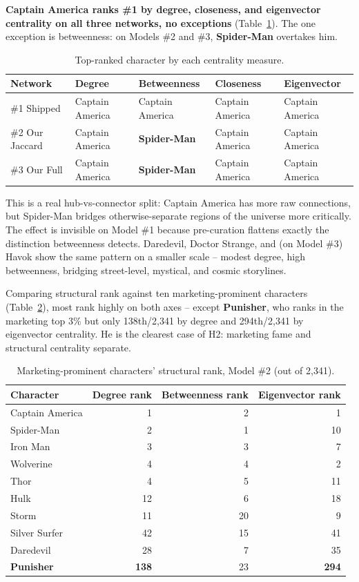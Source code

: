 \documentclass[11pt]{article}
\begin{document}
\textbf{Captain America ranks \#1 by degree, closeness, and eigenvector centrality on all three networks, no exceptions} (Table~\ref{tab:centrality}). The one exception is betweenness: on Models \#2 and \#3, \textbf{Spider-Man} overtakes him.

\begin{table}[H]
\centering
\caption{Top-ranked character by each centrality measure.}
\label{tab:centrality}
\begin{tabular}{lllll}
\toprule
Network & Degree & Betweenness & Closeness & Eigenvector \\
\midrule
\#1 Shipped & Captain America & Captain America & Captain America & Captain America \\
\#2 Our Jaccard & Captain America & \textbf{Spider-Man} & Captain America & Captain America \\
\#3 Our Full & Captain America & \textbf{Spider-Man} & Captain America & Captain America \\
\bottomrule
\end{tabular}
\end{table}

This is a real hub-vs-connector split: Captain America has more raw connections, but Spider-Man bridges otherwise-separate regions of the universe more critically. The effect is invisible on Model \#1 because pre-curation flattens exactly the distinction betweenness detects. Daredevil, Doctor Strange, and (on Model \#3) Havok show the same pattern on a smaller scale -- modest degree, high betweenness, bridging street-level, mystical, and cosmic storylines.

Comparing structural rank against ten marketing-prominent characters (Table~\ref{tab:marketing}), most rank highly on both axes -- except \textbf{Punisher}, who ranks in the marketing top 3\% but only 138th/2{,}341 by degree and 294th/2{,}341 by eigenvector centrality. He is the clearest case of H2: marketing fame and structural centrality separate.

\begin{table}[H]
\centering
\small
\caption{Marketing-prominent characters' structural rank, Model \#2 (out of 2{,}341).}
\label{tab:marketing}
\begin{tabular}{lrrr}
\toprule
Character & Degree rank & Betweenness rank & Eigenvector rank \\
\midrule
Captain America & 1 & 2 & 1 \\
Spider-Man & 2 & 1 & 10 \\
Iron Man & 3 & 3 & 7 \\
Wolverine & 4 & 4 & 2 \\
Thor & 4 & 5 & 11 \\
Hulk & 12 & 6 & 18 \\
Storm & 11 & 20 & 9 \\
Silver Surfer & 42 & 15 & 41 \\
Daredevil & 28 & 7 & 35 \\
\textbf{Punisher} & \textbf{138} & 23 & \textbf{294} \\
\bottomrule
\end{tabular}
\end{table}
\end{document}

